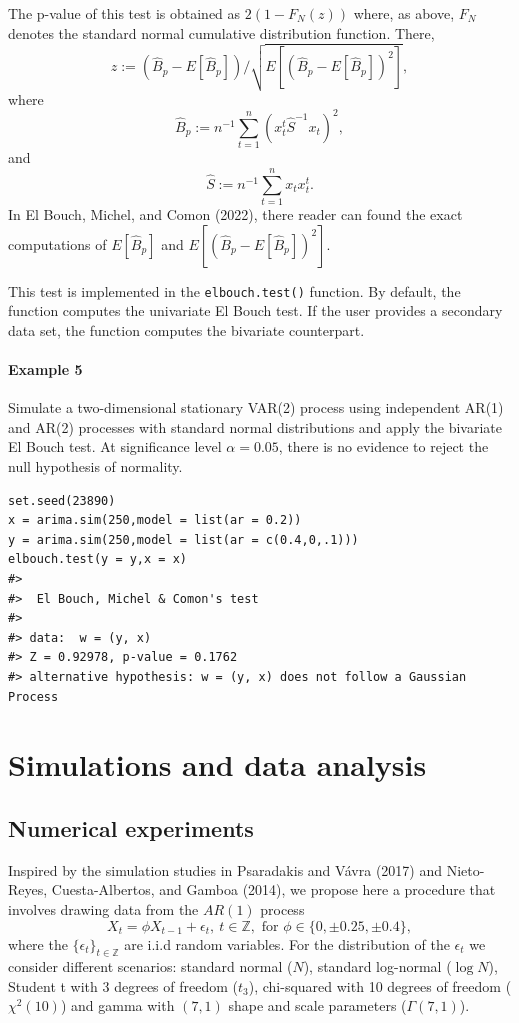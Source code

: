The p-value of this test is obtained as \(2(1-F_N(z))\) where, as above, \(F_N\) denotes the standard normal cumulative distribution function. There,
\[
  z:=(\hat{B}_p-E[\hat{B}_p])/\sqrt{E[(\hat{B}_p-E[\hat{B}_p])^2]},
 \]
where
\[
  \hat{B}_p:=n^{-1}\sum_{t=1}^n(x_t^t \hat{S}^{-1}x_t)^2,
 \]
and
\[
 \hat{S}:=n^{-1}\sum_{t=1}^n x_t x_t^t.
\]
In El Bouch, Michel, and Comon (2022), there reader can found the exact computations of \(E[\hat{B}_p]\) and \(E[(\hat{B}_p-E[\hat{B}_p])^2].\)

This test is implemented in the \texttt{elbouch.test()} function. By default, the function computes the univariate El Bouch test. If the user provides a secondary data set, the function computes the bivariate counterpart.

\hypertarget{example-5}{%
\paragraph{Example 5}\label{example-5}}

Simulate a two-dimensional stationary VAR(2) process using independent AR(1) and AR(2) processes with standard normal distributions and apply the bivariate El Bouch test. At significance level \(\alpha = 0.05\), there is no evidence to reject the null hypothesis of normality.

\begin{verbatim}
set.seed(23890)
x = arima.sim(250,model = list(ar = 0.2))
y = arima.sim(250,model = list(ar = c(0.4,0,.1)))
elbouch.test(y = y,x = x)
#> 
#>  El Bouch, Michel & Comon's test
#> 
#> data:  w = (y, x)
#> Z = 0.92978, p-value = 0.1762
#> alternative hypothesis: w = (y, x) does not follow a Gaussian Process
\end{verbatim}

\hypertarget{simulations-and-data-analysis}{%
\section{Simulations and data analysis}\label{simulations-and-data-analysis}}

\hypertarget{numerical-experiments}{%
\subsection{Numerical experiments}\label{numerical-experiments}}

Inspired by the simulation studies in Psaradakis and Vávra (2017) and Nieto-Reyes, Cuesta-Albertos, and Gamboa (2014), we propose here a procedure that involves drawing data from the \(AR(1)\) process
\begin{equation}
 X_t = \phi X_{t-1} + \epsilon_t, \ t \in\mathbb{Z}, \text{ for } \phi \in \{ 0,\pm 0.25,\pm 0.4\}, \label{eq:eqAR}
\end{equation}
where the \(\{\epsilon_t\}_{t\in\mathbb{Z}}\) are i.i.d random variables. For the distribution of the \(\epsilon_t\) we consider different scenarios: standard normal (\(N\)), standard log-normal (\(\log N\)), Student t with 3 degrees of freedom (\(t_3\)), chi-squared with 10 degrees of freedom (\(\chi^2(10)\)) and gamma with \((7, 1)\) shape and scale parameters (\(\Gamma(7,1)\)).

